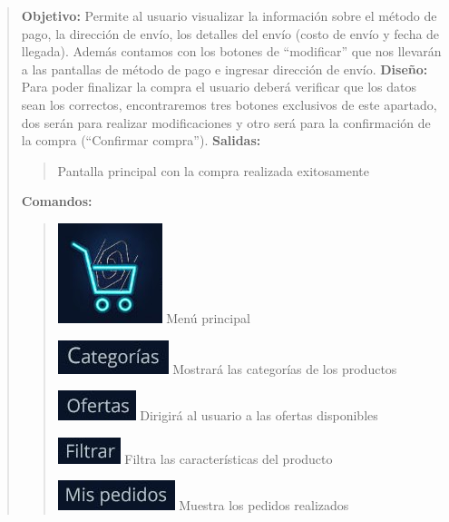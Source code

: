 \documentclass[14pt]{article}
\begin{document}
                \begin{quote}
                    \textbf{Objetivo:} Permite al usuario visualizar la información sobre el método de pago, la dirección de envío, los detalles del envío (costo de envío y fecha de llegada). Además contamos con los botones de “modificar” que nos llevarán a las pantallas de método de pago e ingresar dirección de envío.
                    \textbf{Diseño:} Para poder finalizar la compra el usuario deberá verificar que los datos sean los correctos, encontraremos tres botones exclusivos de este apartado, dos serán para realizar modificaciones y otro será para la confirmación de la compra (“Confirmar compra”).
                    \textbf{Salidas:}
                        \begin{quote}
                            Pantalla principal con la compra realizada exitosamente
                        \end{quote}
                    \textbf{Comandos:}
                        \begin{quote}
                            \includegraphics[height=0.02\textwidth]{BotonMenuPrincipal.jpg}
                            \label{P8:BotonMenuPrincipal} Menú principal
                           
                            \includegraphics[height=0.02\textwidth]{BotonCategorias.jpg}
                            \label{P8:BotonCategorias} Mostrará las categorías de los productos
                           
                            \includegraphics[height=0.02\textwidth]{BotonOfertas.jpg}
                            \label{P8:BotonOfertas} Dirigirá al usuario a las ofertas disponibles
                            
                            \includegraphics[height=0.02\textwidth]{BotonFiltrar.jpg}
                            \label{P8:BotonFiltrar} Filtra las características del producto
                            
                            \includegraphics[height=0.02\textwidth]{BotonMisPedidos.jpg}
                            \label{P8:BotonMisPedidos} Muestra los pedidos realizados
                           

\end{quote}
\end{quote}
\end{document}
